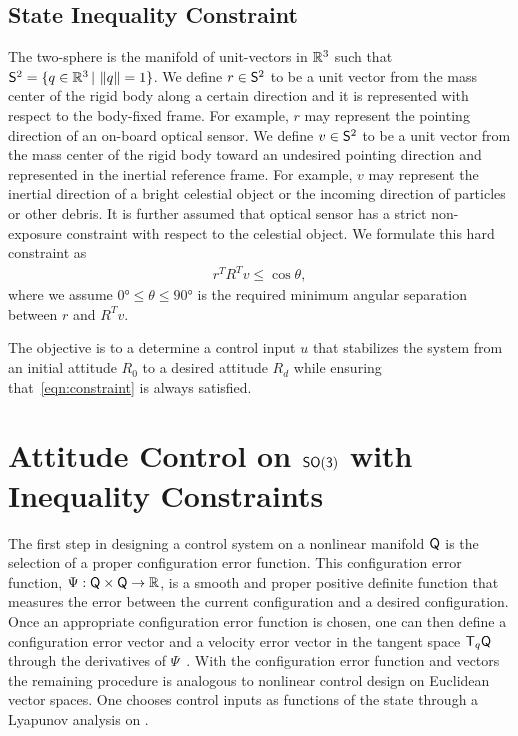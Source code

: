 \documentclass[letterpaper, 10 pt, conference]{ieeeconf}  %
\begin{document}
\subsection{State Inequality Constraint}
The two-sphere is the manifold of unit-vectors in \( \mathbb{R}^3 \) such that \( \mathsf{S}^2 = \{ q \in \mathbb{R}^3 \,  \vert \, \left\| q \right\| = 1 \}\).
We define \( r \in \mathsf{S}^2 \) to be a unit vector from the mass center of the rigid body along a certain direction and it is represented with respect to the body-fixed frame.
For example, \( r \) may represent the pointing direction of an on-board optical sensor.
We define \( v \in \mathsf{S}^2 \) to be a unit vector from the mass center of the rigid body toward an undesired pointing direction and represented in the inertial reference frame.
For example, \( v \) may represent the inertial direction of a bright celestial object or the incoming direction of particles or other debris.
It is further assumed that optical sensor has a strict non-exposure constraint with respect to the celestial object.
We formulate this hard constraint as
\begin{align}
	r^T R^T v \leq \cos \theta , \label{eqn:constraint}
\end{align}
where we assume \( \ang{0} \leq \theta \leq \ang{90}  \) is the required minimum angular separation between \( r \) and \( R^T v \). 

The objective is to a determine a control input \( u \) that stabilizes the system from an initial attitude \( R_0 \) to a desired attitude \( R_d \) while ensuring that~\cref{eqn:constraint} is always satisfied.

\section{Attitude Control on $\mathsf{SO(3)}$ with Inequality Constraints}

The first step in designing a control system on a nonlinear manifold \( \mathsf{Q} \) is the selection of a proper configuration error function. 
This configuration error function, \( \Psi : \mathsf{Q} \times \mathsf{Q} \to \mathbb{R} \), is a smooth and proper positive definite function that measures the error between the current configuration and a desired configuration. 
Once an appropriate configuration error function is chosen, one can then define a configuration error vector and a velocity error vector in the tangent space \( \mathsf{T}_q \mathsf{Q} \) through the derivatives of \( \Psi \)~\cite{bullo2004}. 
With the configuration error function and vectors the remaining procedure is analogous to nonlinear control design on Euclidean vector spaces. 
One chooses control inputs as functions of the state through a Lyapunov analysis on \Q.
\end{document}
